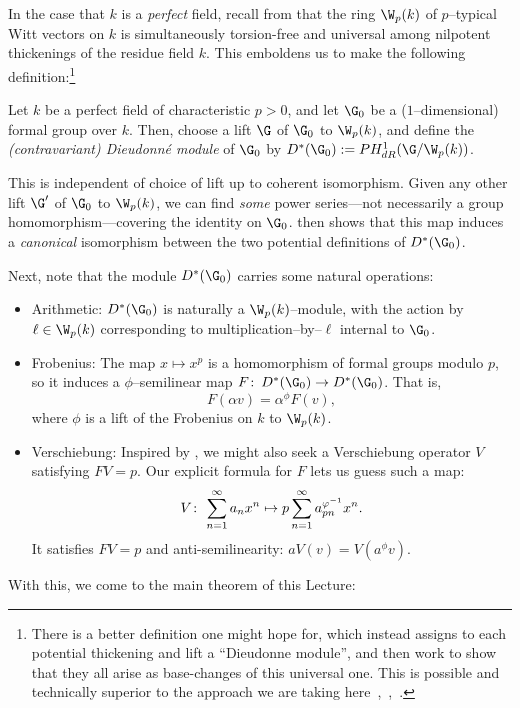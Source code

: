 In the case that \(k\) is a \emph{perfect} field, recall from  that the ring \(\W_p(k)\) of \(p\)--typical Witt vectors on \(k\) is simultaneously torsion-free and universal among nilpotent thickenings of the residue field \(k\).  This emboldens us to make the following definition:\footnote{There is a better definition one might hope for, which instead assigns to each potential thickening and lift a ``Dieudonne module'', and then work to show that they all arise as base-changes of this universal one.  This is possible and technically superior to the approach we are taking here~\cite[Theorem 5.1.6]{Katz},~\cite[Chapter 4]{Messing},~\cite{GrothendieckCristaux}.}

\begin{definition}{\cite[Section 5.5]{Katz}}
Let \(k\) be a perfect field of characteristic \(p > 0\), and let \(\G_0\) be a (\(1\)--dimensional) formal group over \(k\).  Then, choose a lift \(\G\) of \(\G_0\) to \(\W_p(k)\), and define the \textit{(contravariant) Dieudonn\'e module} of \(\G_0\) by \(D^*(\G_0) := PH^1_{dR}(\G / \W_p(k))\).
\end{definition}

\begin{remark}
This is independent of choice of lift up to coherent isomorphism.  Given any other lift \(\G'\) of \(\G_0\) to \(\W_p(k)\), we can find \emph{some} power series---not necessarily a group homomorphism---covering the identity on \(\G_0\).   then shows that this map induces a \emph{canonical} isomorphism between the two potential definitions of \(D^*(\G_0)\).
\end{remark}

Next, note that the module \(D^*(\G_0)\) carries some natural operations:
\begin{itemize}
\item Arithmetic: \(D^*(\G_0)\) is naturally a \(\W_p(k)\)--module, with the action by \(\ell \in \W_p(k)\) corresponding to multiplication--by--\(\ell\) internal to \(\G_0\).
\item {}Frobenius: The map \(x \mapsto x^p\) is a homomorphism of formal groups modulo \(p\), so it induces a \(\phi\)--semilinear map \(F\co D^*(\G_0) \to D^*(\G_0)\).  That is, \[F(\alpha v) = \alpha^\phi F(v),\] where \(\phi\) is a lift of the Frobenius on \(k\) to \(\W_p(k)\).
\item {}Verschiebung: Inspired by , we might also seek a Verschiebung operator \(V\) satisfying \(FV = p\).  Our explicit formula for \(F\) lets us guess such a map: \[V\colon\thinspace \sum_{n=1}^\infty a_n x^n \mapsto p \sum_{n=1}^\infty a_{pn}^{\varphi^{-1}} x^n.\]  It satisfies \(FV = p\) and anti-semilinearity: \(aV(v) = V(a^\phi v)\).
\end{itemize}
With this, we come to the main theorem of this Lecture:

